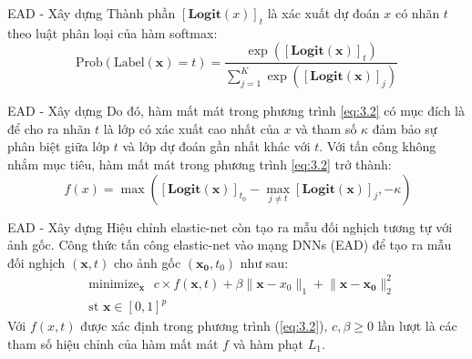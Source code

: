 \begin{frame}{EAD - Xây dựng}
    Thành phần $[\textbf{Logit}(x)]_t$ là xác xuất dự đoán $x$ có nhãn $t$ theo 
    luật phân loại của hàm softmax:
    \begin{equation}
        \label{eq:3.3}
        \text{Prob}(\text{Label}(\mathbf{x}) = t) = \frac{\exp([\textbf{Logit}(\mathbf{x})]_t)}{
            \sum_{j=1}^{K} \exp([\textbf{Logit}(\mathbf{x})]_j)
        }
    \end{equation}
\end{frame}

\begin{frame}{EAD - Xây dựng}
    Do đó, hàm mất mát trong phương trình \ref{eq:3.2} có mục đích là để cho ra nhãn $t$ là 
    lớp có xác xuất cao nhất của $x$ và tham số $\kappa$ đảm bảo sự phân biệt giữa lớp $t$
    và lớp dự đoán gần nhất khác với $t$. Với tấn công không nhắm mục tiêu, hàm mất mát trong 
    phương trình \ref{eq:3.2} trở thành:
    \begin{equation}
        \label{eq:3.4}\
        f(x) = \max { \left([\textbf{Logit}(\mathbf{x})]_{t_0} - 
        \max_{j \neq t} [\textbf{Logit}(\mathbf{x})]_j, -\kappa \right) }
    \end{equation}
\end{frame}

\begin{frame}{EAD - Xây dựng}
    Hiệu chỉnh 
    elastic-net còn tạo ra mẫu đối nghịch tương tự với ảnh gốc. Công thức tấn công elastic-net
    vào mạng DNNs (EAD) để tạo ra mẫu đối nghịch $(\mathbf{x},t)$ cho ảnh gốc $(\mathbf{x_0}, t_0)$ như sau:
    \begin{equation}
        \label{eq:3.5}
        \begin{split}
        &\text{minimize}_{\mathbf{x}} \text{ }
        c \times f(\mathbf{x}, t) + \beta \lVert \mathbf{x} - x_0 \rVert_1
        + \lVert \mathbf{x} - \mathbf{x_0} \rVert_2^2 \\
        &\text{st   } \mathbf{x} \in [0,1]^p
        \end{split}
    \end{equation}
    Với $f(x,t)$ được xác định trong phương trình (\ref{eq:3.2}), $c, \beta \geq 0$ lần lượt 
    là các tham số  hiệu chỉnh của hàm mất mát $f$ và hàm phạt $L_1$.
\end{frame}